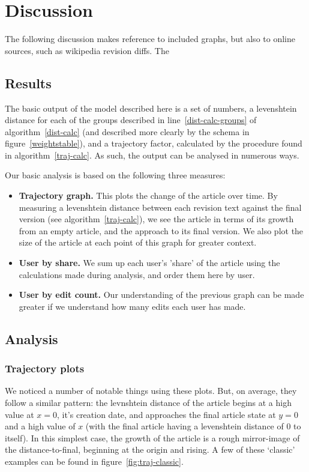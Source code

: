 \chapter {Discussion}
The following discussion makes reference to included graphs, but also
to online sources, such as wikipedia revision diffs. The 

\section{Results}
The basic output of the model described here is a set of numbers, a
levenshtein distance for each of the groups described in
line~\ref{dist-calc-groups} of algorithm~\ref{dist-calc} (and
described more clearly by the schema in figure~\ref{weightstable}),
and a trajectory factor, calculated by the procedure found in
algorithm~\ref{traj-calc}. As such, the output can be analysed in
numerous ways.

Our basic analysis is based on the following three measures:
\begin{itemize}[]
\item \textbf{Trajectory graph.} This plots the change of the article
  over time. By measuring a levenshtein distance between each revision
  text against the final version (see algorithm~\ref{traj-calc}), we
  see the article in terms of its growth from an empty article, and
  the approach to its final version. We also plot the size of the
  article at each point of this graph for greater context.
\item \textbf{User by share.} We sum up each user's 'share' of the
  article using the calculations made during analysis, and order them
  here by user.
\item \textbf{User by edit count.} Our understanding of the previous
  graph can be made greater if we understand how many edits each user
  has made.
\end{itemize}

\section{Analysis}
\subsection*{Trajectory plots}
We noticed a number of notable things using these plots. But, on
average, they follow a similar pattern: the levnshtein distance of the
article begins at a high value at $x=0$, it's creation date, and
approaches the final article state at $y=0$ and a high value of $x$
(with the final article having a levenshtein distance of $0$ to
itself). In this simplest case, the growth of the article is a rough
mirror-image of the distance-to-final, beginning at the origin and
rising. A few of these `classic' examples can be found in
figure~\ref{fig:traj-classic}.

